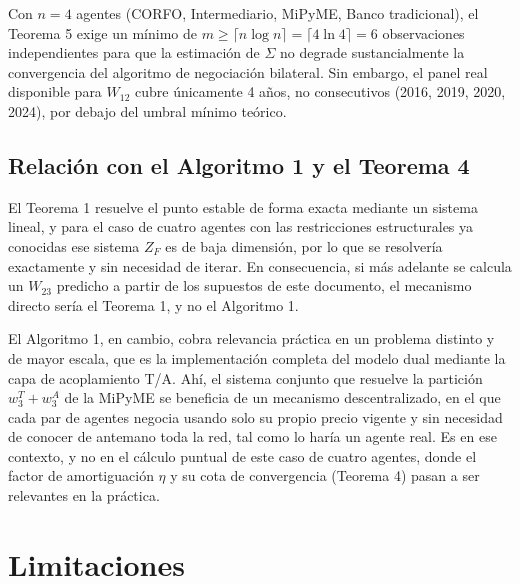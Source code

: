 \documentclass[11pt]{article}
\begin{document}
Con $n=4$ agentes (CORFO, Intermediario, MiPyME, Banco tradicional), el Teorema 5 exige un mínimo de $m \geq \lceil n\log n\rceil = \lceil 4\ln 4\rceil = 6$ observaciones independientes para que la estimación de $\Sigma$ no degrade sustancialmente la convergencia del algoritmo de negociación bilateral. Sin embargo, el panel real disponible para $W_{12}$ cubre únicamente 4 años, no consecutivos (2016, 2019, 2020, 2024), por debajo del umbral mínimo teórico.

\subsection{Relación con el Algoritmo 1 y el Teorema 4}

El Teorema 1 resuelve el punto estable de forma exacta mediante un sistema lineal, y para el caso de cuatro agentes con las restricciones estructurales ya conocidas ese sistema $Z_F$ es de baja dimensión, por lo que se resolvería exactamente y sin necesidad de iterar. En consecuencia, si más adelante se calcula un $W_{23}$ predicho a partir de los supuestos de este documento, el mecanismo directo sería el Teorema 1, y no el Algoritmo 1.

El Algoritmo 1, en cambio, cobra relevancia práctica en un problema distinto y de mayor escala, que es la implementación completa del modelo dual mediante la capa de acoplamiento T/A. Ahí, el sistema conjunto que resuelve la partición $w_3^T + w_3^A$ de la MiPyME se beneficia de un mecanismo descentralizado, en el que cada par de agentes negocia usando solo su propio precio vigente y sin necesidad de conocer de antemano toda la red, tal como lo haría un agente real. Es en ese contexto, y no en el cálculo puntual de este caso de cuatro agentes, donde el factor de amortiguación $\eta$ y su cota de convergencia (Teorema 4) pasan a ser relevantes en la práctica.

\section{Limitaciones}
\label{sec:limitaciones}
\end{document}
